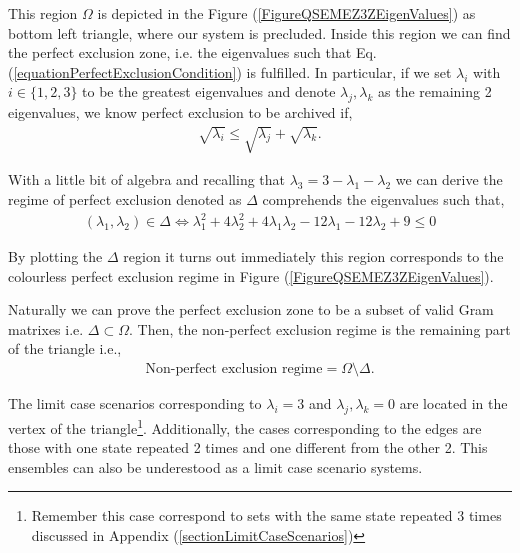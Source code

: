 \documentclass[12pt,letterpaper]{article}
\begin{document}
This region $\Omega$ is depicted in the Figure (\ref{FigureQSEMEZ3ZEigenValues}) as bottom left triangle, where our system is precluded. Inside this region we can find the perfect exclusion zone, i.e. the eigenvalues such that Eq.(\ref{equationPerfectExclusionCondition}) is fulfilled. In particular, if we set $\lambda_i$ with $i\in\{1,2,3\}$ to be the greatest eigenvalues and denote $\lambda_j,\lambda_k$ as the remaining 2 eigenvalues, we know perfect exclusion to be archived if,
\begin{align*}
	\sqrt{\lambda_i}\leq \sqrt{\lambda_j}+\sqrt{\lambda_k}.
\end{align*}

With a little bit of algebra and recalling that $\lambda_3=3-\lambda_1-\lambda_2$ we can derive the regime of perfect exclusion denoted as $\Delta$ comprehends the eigenvalues such that,
\begin{align*}
	(\lambda_1,\lambda_2)\in \Delta\Leftrightarrow\lambda_1^2 + 4\lambda_2^2 + 4\lambda_1\lambda_2 - 12\lambda_1 - 12\lambda_2 + 9 \leq 0
\end{align*}

By plotting the $\Delta$ region it turns out immediately this region corresponds to the colourless perfect exclusion regime in Figure (\ref{FigureQSEMEZ3ZEigenValues}).


Naturally we can prove the perfect exclusion zone to be a subset of valid Gram matrixes i.e. $\Delta\subset \Omega$. Then, the non-perfect exclusion regime is the remaining part of the triangle i.e.,
\begin{align*}
	\text{Non-perfect exclusion regime}=\Omega\setminus \Delta.
\end{align*}

The limit case scenarios corresponding to $\lambda_i=3$ and $\lambda_j,\lambda_k=0$ are located in the vertex of the triangle\footnote{Remember this case correspond to sets with the same state repeated 3 times discussed in Appendix (\ref{sectionLimitCaseScenarios})}. Additionally, the cases corresponding to the edges are those with one state repeated 2 times and one different from the other 2. This ensembles can also be underestood as a limit case scenario systems.
\end{document}
